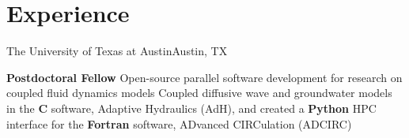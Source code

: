 \documentclass[letterpaper,10pt]{article}
\begin{document}
\strut{} %

\vspace{239pt}


%
%
%
%


\vspace{-2pt}
\section{Experience}
  \resumeSubHeadingListStart

    \resumeSubheading
      {The University of Texas at Austin}{Austin, TX}

      \resumeSubSubheading
        {\textbf{Postdoctoral Fellow}}{}
        \resumeItemListStart
            {Open-source parallel software development for research on coupled
            fluid dynamics models}
            {Coupled diffusive wave and groundwater models in the \textbf{C}
            software, Adaptive Hydraulics (AdH), and created a \textbf{Python}
            HPC interface for the \textbf{Fortran} software, ADvanced
            CIRCulation (ADCIRC)}
        \resumeItemListEnd
\end{document}
